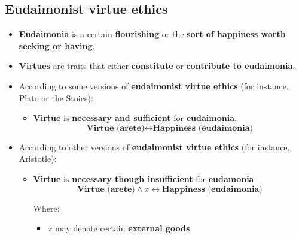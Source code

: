 \documentclass[11pt]{article}
\begin{document}
\subsection{Eudaimonist virtue ethics}
\label{sec:org9517de7}
\begin{itemize}
\item \textbf{Eudaimonia} is a certain \textbf{flourishing} or the \textbf{sort of happiness worth seeking or having}.
\item \textbf{Virtues} are traits that either \textbf{constitute} or \textbf{contribute to eudaimonia}.
\item According to some versions of \textbf{eudaimonist virtue ethics} (for instance, Plato or the Stoics):
\begin{itemize}
\item \textbf{Virtue} is \textbf{necessary and sufficient} for \textbf{eudaimonia}.
\[\textbf{Virtue (arete)} \leftrightarrow \textbf{Happiness (eudaimonia)}\]
\end{itemize}
\item According to other versions of \textbf{eudaimonist virtue ethics} (for instance, Aristotle):
\begin{itemize}
\item \textbf{Virtue} is \textbf{necessary though insufficient} for \textbf{eudamonia}:
\[\textbf{Virtue (arete)} \wedge x \leftrightarrow \textbf{Happiness (eudaimonia)}\]

Where:
\begin{itemize}
\item \(x\) may denote certain \textbf{external goods}.
\end{itemize}
\end{itemize}
\end{itemize}

 \newpage
\end{document}
